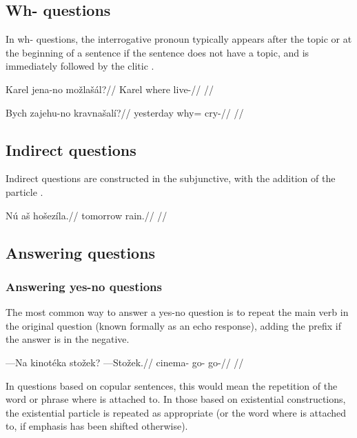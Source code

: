 \subsection{Wh- questions}
In wh- questions, the interrogative pronoun typically appears after the topic or at the beginning of a sentence if the sentence does not have a topic, and is immediately followed by the clitic .

\pex
\begingl
\gla Karel jena-no mo\v{z}la\v{s}\'al?//
\glb Karel where live-//
\glft {}//
\endgl
\xe

\pex
\begingl
\gla Bych zajehu-no kravna\v{s}al\'i?//
\glb yesterday why= cry-//
\glft {}//
\endgl
\xe

\subsection{Indirect questions}

Indirect questions are constructed in the subjunctive, with the addition of the particle .

\pex
\begingl
\gla N\'u a\v{s} ho\v{s}ez\'ila.//
\glb tomorrow  rain.//
\glft {}//
\endgl
\xe

\subsection{Answering questions}

\subsubsection{Answering yes-no questions}
The most common way to answer a yes-no question is to repeat the main verb in the original question (known formally as an echo response), adding the prefix  if the answer is in the negative.

\pex
\begingl
\gla ---Na kinot\'eka sto\v{z}ek? ---Sto\v{z}ek.//
\glb {} cinema- go- go-//
\glft {}//
\endgl
\xe

In questions based on copular sentences, this would mean the repetition of the word or phrase where  is attached to. In those based on existential constructions, the existential particle is repeated as appropriate (or the word where  is attached to, if emphasis has been shifted otherwise).

